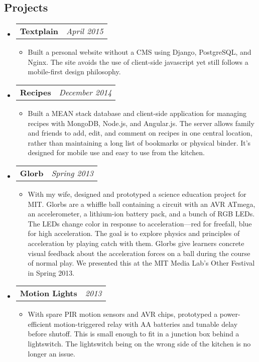 \documentclass[10pt,letterpaper]{article}
\newcommand{\headerrow}[2]{%
    \begin{tabularx}{\linewidth}{Xr}
	    #1 & #2 \\
    \end{tabularx}
}
\begin{document}
\subsection*{Projects}
    \begin{itemize}
        \item \headerrow{\textbf{Textplain}}{\emph{April 2015}}
        \begin{itemize}
            \item Built a personal website without a CMS using Django,
                PostgreSQL, and Nginx.  The site avoids the use of client-side
                javascript yet still follows a mobile-first design philosophy.
        \end{itemize}

        \item \headerrow{\textbf{Recipes}}{\emph{December 2014}}
        \begin{itemize}
            \item Built a MEAN stack database and client-side application for
                managing recipes with MongoDB, Node.js, and Angular.js.  The
                server allows family and friends to add, edit, and comment on
                recipes in one central location, rather than maintaining a long
                list of bookmarks or physical binder.  It's designed for mobile
                use and easy to use from the kitchen.
        \end{itemize}

        \item \headerrow{\textbf{Glorb}}{\emph{Spring 2013}}
        \begin{itemize}
            \item With my wife, designed and prototyped a science education
                project for MIT\@.  Glorbs are a whiffle ball containing a
                circuit with an AVR ATmega, an accelerometer, a lithium-ion
                battery pack, and a bunch of RGB LEDs.  The LEDs change color
                in response to acceleration---red for freefall, blue for high
                acceleration.  The goal is to explore physics and principles of
                acceleration by playing catch with them.  Glorbs give learners
                concrete visual feedback about the acceleration forces on a
                ball during the course of normal play.  We presented this at
                the MIT Media Lab's Other Festival in Spring 2013.
        \end{itemize}

        \item \headerrow{\textbf{Motion Lights}}{\emph{2013}}
        \begin{itemize}
            \item With spare PIR motion sensors and AVR chips, prototyped a
                power-efficient motion-triggered relay with AA batteries and
                tunable delay before shutoff.  This is small enough to fit in a
                junction box behind a lightswitch.  The lightswitch being on
                the wrong side of the kitchen is no longer an issue.
        \end{itemize}
    \end{itemize}
\end{document}
